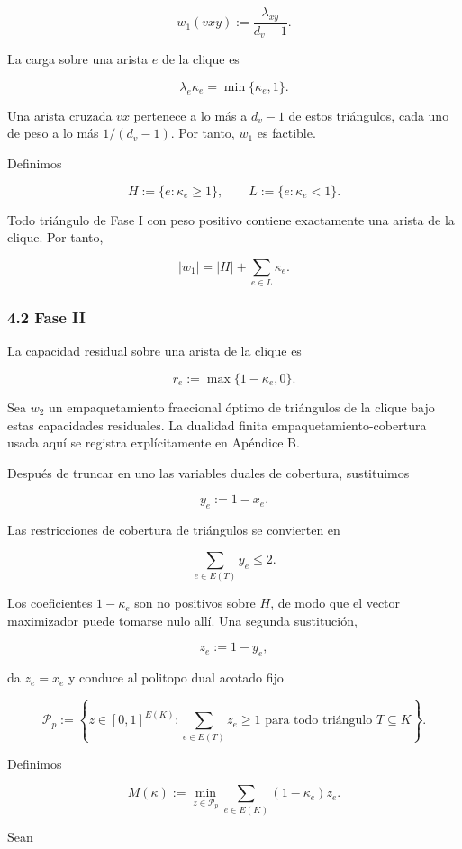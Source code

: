 \documentclass[
  spanish,
  11pt,
  a4paper,
]{article}
\begin{document}
\[
w_1(vxy)
:=
\frac{\lambda_{xy}}{d_v-1}.
\tag{4.1}
\]

La carga sobre una arista \(e\) de la clique es

\[
\lambda_e\kappa_e
=
\min\{\kappa_e,1\}.
\tag{4.2}
\]

Una arista cruzada \(vx\) pertenece a lo más a \(d_v-1\) de estos triángulos, cada uno de peso a lo más \(1/(d_v-1)\). Por tanto, \(w_1\) es factible.

Definimos

\[
H:=\{e:\kappa_e\ge1\},
\qquad
L:=\{e:\kappa_e<1\}.
\]

Todo triángulo de Fase I con peso positivo contiene exactamente una arista de la clique. Por tanto,

\[
|w_1|
=
|H|+\sum_{e\in L}\kappa_e.
\tag{4.3}
\]

\subsubsection{4.2 Fase II}\label{fase-ii}

La capacidad residual sobre una arista de la clique es

\[
r_e:=\max\{1-\kappa_e,0\}.
\tag{4.4}
\]

Sea \(w_2\) un empaquetamiento fraccional óptimo de triángulos de la clique bajo estas capacidades residuales. La dualidad finita empaquetamiento-cobertura usada aquí se registra explícitamente en Apéndice B.

Después de truncar en uno las variables duales de cobertura, sustituimos

\[
y_e:=1-x_e.
\]

Las restricciones de cobertura de triángulos se convierten en

\[
\sum_{e\in E(T)}y_e\le2.
\]

Los coeficientes \(1-\kappa_e\) son no positivos sobre \(H\), de modo que el vector maximizador puede tomarse nulo allí. Una segunda sustitución,

\[
z_e:=1-y_e,
\]

da \(z_e=x_e\) y conduce al politopo dual acotado fijo

\[
\mathcal P_p
:=
\left\{
z\in[0,1]^{E(K)}:
\sum_{e\in E(T)}z_e\ge1
\text{ para todo triángulo }T\subseteq K
\right\}.
\tag{4.5}
\]

Definimos

\[
M(\kappa)
:=
\min_{z\in\mathcal P_p}
\sum_{e\in E(K)}(1-\kappa_e)z_e.
\tag{4.6}
\]

Sean
\end{document}
